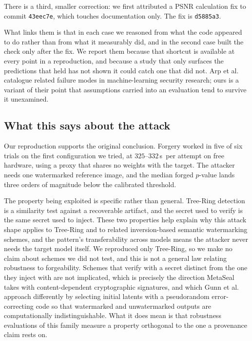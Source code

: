 \documentclass[10pt,twocolumn]{article}
\newcommand{\code}[1]{\texttt{\small #1}}
\newcommand{\reptime}{$325$--$332$\,s}
\begin{document}
There is a third, smaller correction: we first attributed a PSNR calculation fix to
commit \code{43eec7e}, which touches documentation only. The fix is \code{d5885a3}.

What links them is that in each case we reasoned from what the code appeared to do
rather than from what it measurably did, and in the second case built the check only
after the fix. We report them because that shortcut is available at every point in a
reproduction, and because a study that only surfaces the predictions that held has
not shown it could catch one that did not. Arp et
al.~\cite{arp2022dosdonts} catalogue related failure modes in machine-learning
security research; ours is a variant of their point that assumptions carried into an
evaluation tend to survive it unexamined.

\subsection{What this says about the attack}

Our reproduction supports the original conclusion. Forgery worked in five of six
trials on the first configuration we tried, at \reptime\ per attempt on free
hardware, using a proxy that shares no weights with the target. The attacker needs one
watermarked reference image, and the median forged $p$-value lands three orders of
magnitude below the calibrated threshold.

The property being exploited is specific rather than general. Tree-Ring detection is a
similarity test against a recoverable artifact, and the secret used to verify is the
same secret used to inject. These two properties help explain why this attack shape applies to Tree-Ring and to
related inversion-based semantic watermarking schemes, and the pattern's
transferability across models means the attacker never needs the target model itself.
We reproduced only Tree-Ring, so we make no claim about schemes we did not test, and
this is not a general law relating robustness to forgeability.
Schemes that verify with a secret distinct from the one they inject with are not
implicated, which is precisely the direction MetaSeal~\cite{zhou2026metaseal} takes
with content-dependent cryptographic signatures, and which Gunn et
al.~\cite{gunn2025undetectable} approach differently by selecting initial latents
with a pseudorandom error-correcting code so that watermarked and unwatermarked
outputs are computationally indistinguishable.
What it does mean is that robustness evaluations of this family measure a property
orthogonal to the one a provenance claim rests on.
\end{document}
